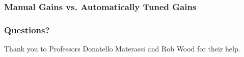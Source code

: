 \documentclass{beamer}
\begin{document}
\begin{frame}
    \frametitle{Manual Gains vs. Automatically Tuned Gains}
    \begin{figure}[H]
    \end{figure}
\end{frame}


\begin{frame}
    \frametitle{Questions?}
    \begin{center}
        \scriptsize
        Thank you to Professors Donatello Materassi and Rob Wood for their help.
    \end{center}
\end{frame}
\end{document}
